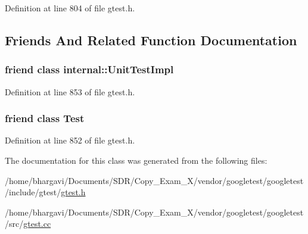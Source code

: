 Definition at line 804 of file gtest.\+h.



\subsection{Friends And Related Function Documentation}
\subsubsection[{\texorpdfstring{internal\+::\+Unit\+Test\+Impl}{internal::UnitTestImpl}}]{\setlength{\rightskip}{0pt plus 5cm}friend class {\bf internal\+::\+Unit\+Test\+Impl}\hspace{0.3cm}{\ttfamily [friend]}}\hypertarget{classtesting_1_1_test_case_acc0a5e7573fd6ae7ad1878613bb86853}{}\label{classtesting_1_1_test_case_acc0a5e7573fd6ae7ad1878613bb86853}


Definition at line 853 of file gtest.\+h.

\subsubsection[{\texorpdfstring{Test}{Test}}]{\setlength{\rightskip}{0pt plus 5cm}friend class {\bf Test}\hspace{0.3cm}{\ttfamily [friend]}}\hypertarget{classtesting_1_1_test_case_a5b78b1c2e1fa07ffed92da365593eaa4}{}\label{classtesting_1_1_test_case_a5b78b1c2e1fa07ffed92da365593eaa4}


Definition at line 852 of file gtest.\+h.



The documentation for this class was generated from the following files\+:\begin{DoxyCompactItemize}
\item 
/home/bhargavi/\+Documents/\+S\+D\+R/\+Copy\+\_\+\+Exam\+\_\+X/vendor/googletest/googletest/include/gtest/\hyperlink{gtest_8h}{gtest.\+h}\item 
/home/bhargavi/\+Documents/\+S\+D\+R/\+Copy\+\_\+\+Exam\+\_\+X/vendor/googletest/googletest/src/\hyperlink{gtest_8cc}{gtest.\+cc}\end{DoxyCompactItemize}
